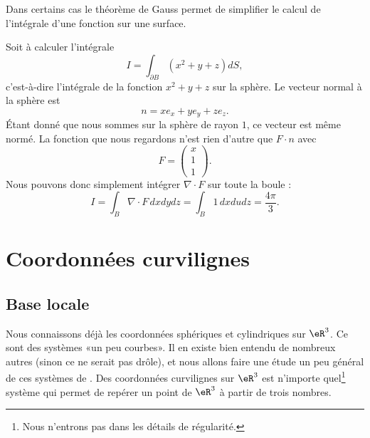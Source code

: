 Dans certains cas le théorème de Gauss permet de simplifier le calcul de l'intégrale d'une fonction sur une surface.

\begin{example}
	Soit à calculer l'intégrale
	\begin{equation}
		I=\int_{\partial B}(x^2+y+z)dS,
	\end{equation}
	c'est-à-dire l'intégrale de la fonction $x^2+y+z$ sur la sphère. Le vecteur normal à la sphère est
	\begin{equation}
		n=xe_x+ye_y+ze_z.
	\end{equation}
	Étant donné que nous sommes sur la sphère de rayon $1$, ce vecteur est même normé. La fonction que nous regardons n'est rien d'autre que $F\cdot n$ avec
	\begin{equation}
		F=\begin{pmatrix}
			x \\
			1 \\
			1
		\end{pmatrix}.
	\end{equation}
	Nous pouvons donc simplement intégrer $\nabla\cdot F$ sur toute la boule :
	\begin{equation}
		I=\int_{B}\nabla\cdot F\,dxdydz=\int_B 1\,dxdudz=\frac{ 4\pi }{ 3 }.
	\end{equation}
\end{example}

\section{Coordonnées curvilignes}

\subsection{Base locale}

Nous connaissons déjà les coordonnées sphériques et cylindriques sur \( \eR^3\). Ce sont des systèmes «un peu courbes». Il en existe bien entendu de nombreux autres (sinon ce ne serait pas drôle), et nous allons faire une étude un peu général de ces systèmes de . Des coordonnées curvilignes sur $\eR^3$ est n'importe quel\footnote{Nous n'entrons pas dans les détails de régularité.} système qui permet de repérer un point de $\eR^3$ à partir de trois nombres.


